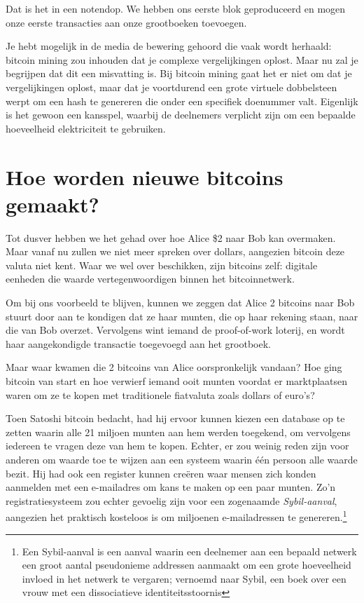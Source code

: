 Dat is het in een notendop. We hebben ons eerste blok geproduceerd en mogen onze eerste transacties aan onze grootboeken toevoegen.

Je hebt mogelijk in de media de bewering gehoord die vaak wordt herhaald: bitcoin mining zou inhouden dat je complexe vergelijkingen oplost. Maar nu zal je begrijpen dat dit een misvatting is. Bij bitcoin mining gaat het er niet om dat je vergelijkingen oplost, maar dat je voortdurend een grote virtuele dobbelsteen werpt om een hash te genereren die onder een specifiek doenummer valt. Eigenlijk is het gewoon een kansspel, waarbij de deelnemers verplicht zijn om een bepaalde hoeveelheid elektriciteit te gebruiken.

\section{Hoe worden nieuwe bitcoins gemaakt?}

Tot dusver hebben we het gehad over hoe Alice \$2 naar Bob kan overmaken. Maar vanaf nu zullen we niet meer spreken over dollars, aangezien bitcoin deze valuta niet kent. Waar we wel over beschikken, zijn bitcoins zelf: digitale eenheden die waarde vertegenwoordigen binnen het bitcoinnetwerk.

Om bij ons voorbeeld te blijven, kunnen we zeggen dat Alice 2 bitcoins naar Bob stuurt door aan te kondigen dat ze haar munten, die op haar \textquotedbl{}rekening\textquotedbl{} staan, naar die van Bob overzet. Vervolgens wint iemand de proof-of-work loterij, en wordt haar aangekondigde transactie toegevoegd aan het grootboek.

Maar waar kwamen die 2 bitcoins van Alice oorspronkelijk vandaan? Hoe ging bitcoin van start en hoe verwierf iemand ooit munten voordat er marktplaatsen waren om ze te kopen met traditionele fiatvaluta zoals dollars of euro’s?

Toen Satoshi bitcoin bedacht, had hij ervoor kunnen kiezen een database op te zetten waarin alle 21 miljoen munten aan hem werden toegekend, om vervolgens iedereen te vragen deze van hem te kopen. Echter, er zou weinig reden zijn voor anderen om waarde toe te wijzen aan een systeem waarin één persoon alle waarde bezit. Hij had ook een register kunnen creëren waar mensen zich konden aanmelden met een e-mailadres om kans te maken op een paar munten. Zo'n registratiesysteem zou echter gevoelig zijn voor een zogenaamde \textit{Sybil-aanval}, aangezien het praktisch kosteloos is om miljoenen e-mailadressen te genereren.\footnote{Een Sybil-aanval is een aanval waarin een deelnemer aan een bepaald netwerk een groot aantal pseudonieme addressen aanmaakt om een grote hoeveelheid invloed in het netwerk te vergaren; vernoemd naar Sybil, een boek over een vrouw met een dissociatieve identiteitsstoornis}

